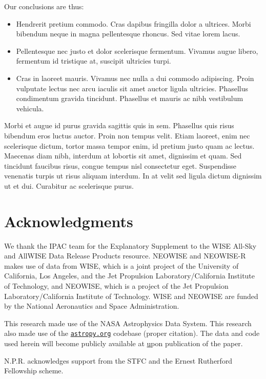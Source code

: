 \documentclass{emulateapj}
\begin{document}
Our conclusions are thus: 
\begin{itemize}
    \item{Hendrerit pretium commodo. Cras dapibus fringilla dolor a
        ultrices. Morbi bibendum neque in magna pellentesque rhoncus. Sed
        vitae lorem lacus.}
    \item{Pellentesque nec justo et dolor scelerisque
        fermentum. Vivamus augue libero, fermentum id tristique at, suscipit
        ultricies turpi.}
    \item{Cras in laoreet mauris. Vivamus nec nulla a dui commodo
        adipiscing. Proin vulputate lectus nec arcu iaculis sit amet auctor
        ligula ultricies. Phasellus condimentum gravida tincidunt. Phasellus
        et mauris ac nibh vestibulum vehicula.}
\end{itemize}

Morbi et augue id purus gravida sagittis quis in sem. Phasellus quis
risus bibendum eros luctus auctor. Proin non tempus velit. Etiam
laoreet, enim nec scelerisque dictum, tortor massa tempor enim, id
pretium justo quam ac lectus. Maecenas diam nibh, interdum at lobortis
sit amet, dignissim et quam. Sed tincidunt faucibus risus, congue
tempus nisl consectetur eget. Suspendisse venenatis turpis ut risus
aliquam interdum. In at velit sed ligula dictum dignissim ut et
dui. Curabitur ac scelerisque purus.



\section{Acknowledgments}
We thank the IPAC team for the Explanatory Supplement to the WISE
All-Sky and AllWISE Data Release Products resource.  NEOWISE and
NEOWISE-R makes use of data from WISE, which is a joint project of the
University of California, Los Angeles, and the Jet Propulsion
Laboratory/California Institute of Technology, and NEOWISE, which is a
project of the Jet Propulsion Laboratory/California Institute of
Technology. WISE and NEOWISE are funded by the National Aeronautics
and Space Administration.

This research made use of the NASA Astrophysics Data System.  This
research also made use of the \href{www.astropy.org}{\tt astropy.org}
codebase (proper citation).  The data and code used herein will become
publicly available at \href{\tt
http://www.legacysurvey.org/dr3/Extreme_wise_quasars/} upon
publication of the paper.

N.P.R. acknowledges support from the STFC and the Ernest Rutherford
Fellowship scheme.
\end{document}
